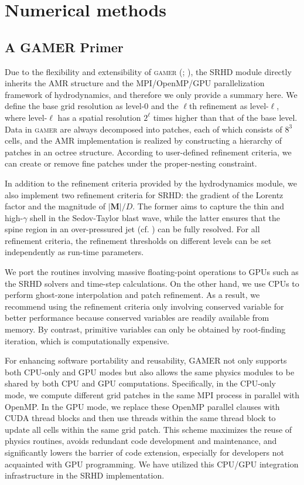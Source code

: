 \chapter{Numerical methods}
\label{c:numerical-methods}

\section{A GAMER Primer}
Due to the flexibility and extensibility of \textsc{gamer} (\citealt{gamer-1}; \citealt{gamer-2}), the SRHD module directly inherits the AMR structure and the MPI/OpenMP/GPU parallelization framework of hydrodynamics, and therefore we only provide a summary here. We define the base grid resolution as level-0 and the $\ell$th refinement as level-$\ell$, where level-$\ell$ has a spatial resolution $2^{\ell}$ times higher than that of the base level. Data in \textsc{gamer} are always decomposed into patches, each of which consists of $8^3$ cells, and the AMR implementation is realized by constructing a hierarchy of patches in an octree structure. According to user-defined refinement criteria, we can create or remove fine patches under the proper-nesting constraint.

In addition to the refinement criteria provided by the hydrodynamics module, we also implement two refinement criteria for SRHD: the gradient of the Lorentz factor and the magnitude of $|\mathbf{M}|/D$. The former aims to capture the thin and high-$\gamma$ shell in the Sedov-Taylor blast wave, while the latter ensures that the spine region in an over-pressured jet (cf. ) can be fully resolved. For all refinement criteria, the refinement thresholds on different levels can be set independently as run-time parameters.

We port the routines involving massive floating-point operations to GPUs such as the SRHD solvers and time-step calculations. On the other hand, we use CPUs to perform ghost-zone interpolation and patch refinement. As a result, we recommend using the refinement criteria only involving conserved variable for better performance because conserved variables are readily available from memory. By contrast, primitive variables can only be obtained by root-finding iteration, which is computationally expensive.

For enhancing software portability and reusability, GAMER not only supports both CPU-only and GPU modes but also allows the same physics modules to be shared by both CPU and GPU computations. Specifically, in the CPU-only mode, we compute different grid patches in the same MPI process in parallel with OpenMP. In the GPU mode, we replace these OpenMP parallel clauses with CUDA thread blocks and then use threads within the same thread block to update all cells within the same grid patch. This scheme maximizes the reuse of physics routines, avoids redundant code development and maintenance, and significantly lowers the barrier of code extension, especially for developers not acquainted with GPU programming. We have utilized this CPU/GPU integration infrastructure in the SRHD implementation.

